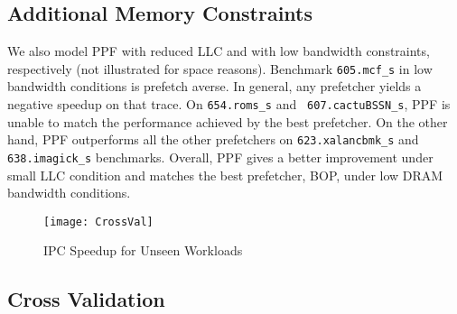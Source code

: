 \subsection{Additional Memory Constraints}
\label{Results-AdditionalMem}


We also model PPF with reduced LLC and with low bandwidth constraints,
respectively (not illustrated for space reasons). Benchmark {\tt 605.mcf\_s}
in low bandwidth conditions is prefetch averse. In general, any prefetcher
yields a negative speedup on that trace. On {\tt 654.roms\_s} and {\tt
607.cactuBSSN\_s}, PPF is unable to match the performance achieved by the best
prefetcher. On the other hand, PPF outperforms all the other prefetchers on
{\tt 623.xalancbmk\_s} and {\tt 638.imagick\_s} benchmarks. Overall, PPF
gives a better improvement under small LLC condition and matches the best
prefetcher, BOP, under low DRAM bandwidth conditions.


\begin{figure}[ht]
\begin{adjustwidth}{-0.4cm}{}
\texttt{[image: CrossVal]}
\caption{IPC Speedup for Unseen Workloads}
\label{Fig:CrossVal}
\end{adjustwidth}
\end{figure}

\subsection{Cross Validation}
\label{Results-CrossVal}

%
%

